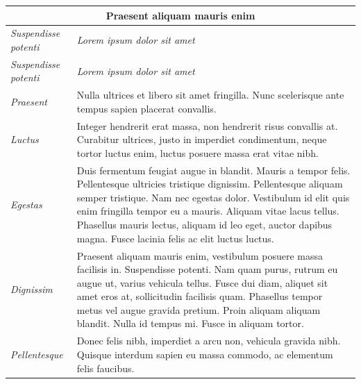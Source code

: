 \begin{center}
	\begin{longtable}{ | p{} | p{} | }
		
		\hline
		\multicolumn{2}{|c|}{\textbf{Praesent aliquam mauris enim}}
		\\ \hline
		
		\emph{Suspendisse potenti} & \emph{Lorem ipsum dolor sit amet}
		\\ \hline \hline
		\endfirsthead %
		
		\hline
		\emph{Suspendisse potenti} & \emph{Lorem ipsum dolor sit amet}
		\\ \hline \hline
		\endhead %
		
		\hline
		\endfoot %
		
		\endlastfoot %
		
		\emph{Praesent}
		& Nulla ultrices et libero sit amet fringilla. Nunc scelerisque ante tempus sapien placerat convallis.
		\\ \hline
		
		\emph{Luctus}
		& Integer hendrerit erat massa, non hendrerit risus convallis at. Curabitur ultrices, justo in imperdiet condimentum, neque tortor luctus enim, luctus posuere massa erat vitae nibh.
		\\ \hline
		
		\emph{Egestas}
		& Duis fermentum feugiat augue in blandit. Mauris a tempor felis. Pellentesque ultricies tristique dignissim. Pellentesque aliquam semper tristique. Nam nec egestas dolor. Vestibulum id elit quis enim fringilla tempor eu a mauris. Aliquam vitae lacus tellus. Phasellus mauris lectus, aliquam id leo eget, auctor dapibus magna. Fusce lacinia felis ac elit luctus luctus.
		\\ \hline
		
		\emph{Dignissim}
		& Praesent aliquam mauris enim, vestibulum posuere massa facilisis in. Suspendisse potenti. Nam quam purus, rutrum eu augue ut, varius vehicula tellus. Fusce dui diam, aliquet sit amet eros at, sollicitudin facilisis quam. Phasellus tempor metus vel augue gravida pretium. Proin aliquam aliquam blandit. Nulla id tempus mi. Fusce in aliquam tortor.
		\\ \hline
		
		\emph{Pellentesque}
		& Donec felis nibh, imperdiet a arcu non, vehicula gravida nibh. Quisque interdum sapien eu massa commodo, ac elementum felis faucibus.
		\\ \hline
		

\end{longtable}
\end{center}
